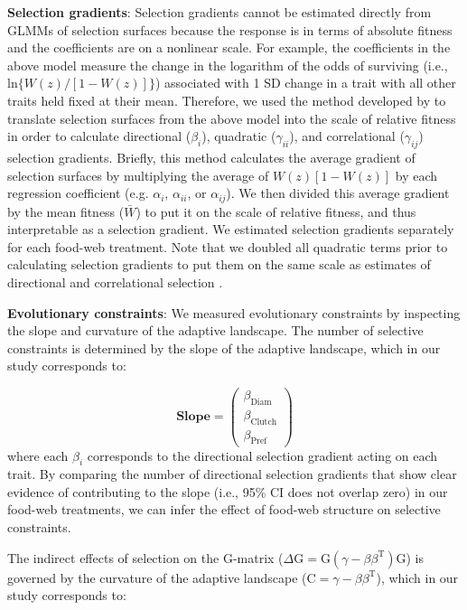 \documentclass[11pt,]{article}
\begin{document}
\textbf{Selection gradients}: Selection gradients cannot be estimated
directly from GLMMs of selection surfaces because the response is in
terms of absolute fitness and the coefficients are on a nonlinear scale.
For example, the coefficients in the above model measure the change in
the logarithm of the odds of surviving (i.e.,
\(\text{ln}\{W(z)/[1-W(z)]\}\)) associated with 1 SD change in a trait
with all other traits held fixed at their mean. Therefore, we used the
method developed by \citet{Janzen1998} to translate selection surfaces
from the above model into the scale of relative fitness in order to
calculate directional (\(\beta_i\)), quadratic (\(\gamma_{ii}\)), and
correlational (\(\gamma_{ij}\)) selection gradients. Briefly, this
method calculates the average gradient of selection surfaces by
multiplying the average of \(W(z)[1-W(z)]\) by each regression
coefficient (e.g. \(\alpha_i\), \(\alpha_{ii}\), or \(\alpha_{ij}\)). We
then divided this average gradient by the mean fitness (\(\bar W\)) to
put it on the scale of relative fitness, and thus interpretable as a
selection gradient. We estimated selection gradients separately for each
food-web treatment. Note that we doubled all quadratic terms prior to
calculating selection gradients to put them on the same scale as
estimates of directional and correlational selection
\citep{Stinchcombe2008}.

\textbf{Evolutionary constraints}: We measured evolutionary constraints
by inspecting the slope and curvature of the adaptive landscape. The
number of selective constraints is determined by the slope of the
adaptive landscape, which in our study corresponds to:

\[\textbf{Slope} = \begin{pmatrix} \beta_{\text{Diam}} \\ \beta_{\text{Clutch}} \\ \beta_{\text{Pref}} \end{pmatrix} \]
where each \(\beta_i\) corresponds to the directional selection gradient
acting on each trait. By comparing the number of directional selection
gradients that show clear evidence of contributing to the slope (i.e.,
95\% CI does not overlap zero) in our food-web treatments, we can infer
the effect of food-web structure on selective constraints.

The indirect effects of selection on the G-matrix
(\(\Delta\text{G}=\text{G}(\gamma - \beta \beta^\text{T})\text{G}\)) is
governed by the curvature of the adaptive landscape
(\(\text{C}=\gamma - \beta \beta^\text{T}\)), which in our study
corresponds to:
\end{document}
